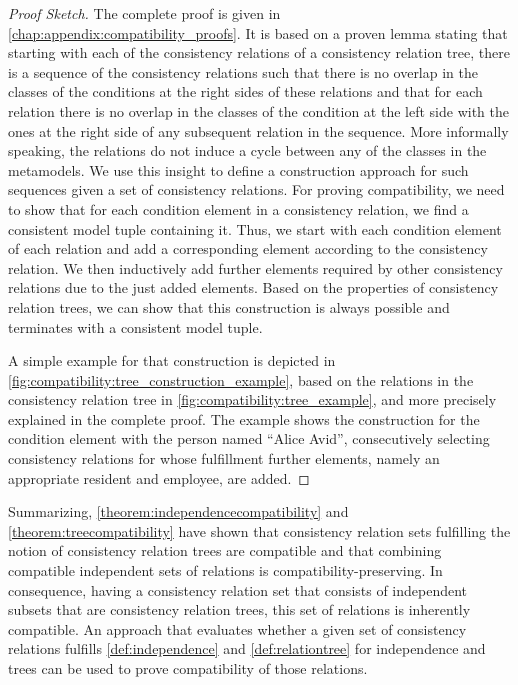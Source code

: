 \begin{proof}[Proof Sketch]
    The complete proof is given in \autoref{chap:appendix:compatibility_proofs}.
    It is based on a proven lemma stating that starting with each of the consistency relations of a consistency relation tree, there is a sequence of the consistency relations such that there is no overlap in the classes of the conditions at the right sides of these relations and that for each relation there is no overlap in the classes of the condition at the left side with the ones at the right side of any subsequent relation in the sequence.
    More informally speaking, the relations do not induce a cycle between any of the classes in the metamodels.
    We use this insight to define a construction approach for such sequences given a set of consistency 
    relations.
    For proving compatibility, we need to show that for each condition element in a consistency relation, we find a consistent model tuple containing it.
    Thus, we start with each condition element of each relation and add a corresponding element according to the consistency relation.
    We then inductively add further elements required by other consistency relations due to the just added elements.
    Based on the properties of consistency relation trees, we can show that this construction is always possible and terminates with a consistent model tuple.
    
    A simple example for that construction is depicted in \autoref{fig:compatibility:tree_construction_example}, based on the relations in the consistency relation tree in \autoref{fig:compatibility:tree_example}, and more precisely explained in the complete proof.
    The example shows the construction for the condition element with the person named \enquote{Alice Avid}, consecutively selecting consistency relations for whose fulfillment further elements, namely an appropriate resident and employee, are added.
\end{proof}

Summarizing, \autoref{theorem:independencecompatibility} and \autoref{theorem:treecompatibility} have shown that consistency relation sets fulfilling the notion of consistency relation trees are compatible and that combining compatible independent sets of relations is compatibility-preserving.
In consequence, having a consistency relation set that consists of independent subsets that are consistency relation trees, this set of relations is inherently compatible.
An approach that evaluates whether a given set of consistency relations fulfills \autoref{def:independence} and \autoref{def:relationtree} for independence and trees can be used to prove compatibility of those relations.

